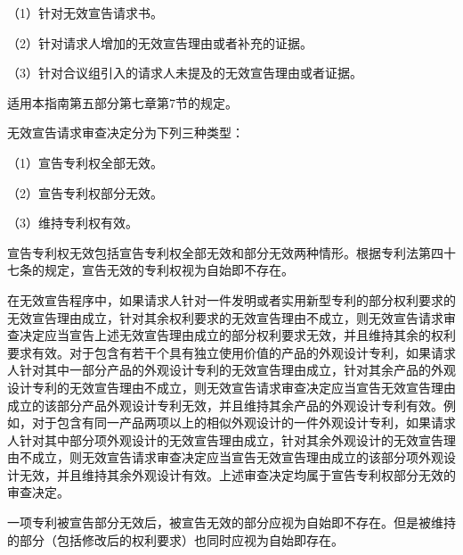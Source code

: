{\setlength{\parindent}{17.1bp}（1）针对无效宣告请求书。\par}

{\setlength{\parindent}{17.1bp}（2）针对请求人增加的无效宣告理由或者补充的证据。\par}

{\setlength{\parindent}{17.1bp}（3）针对合议组引入的请求人未提及的无效宣告理由或者证据。\par}



适用本指南第五部分第七章第7节的规定。

无效宣告请求审查决定分为下列三种类型：

{\setlength{\parindent}{17.1bp}（1）宣告专利权全部无效。\par}

{\setlength{\parindent}{17.1bp}（2）宣告专利权部分无效。\par}

{\setlength{\parindent}{17.1bp}（3）维持专利权有效。\par}

宣告专利权无效包括宣告专利权全部无效和部分无效两种情形。根据专利法第四十七条的规定，宣告无效的专利权视为自始即不存在。

在无效宣告程序中，如果请求人针对一件发明或者实用新型专利的部分权利要求的无效宣告理由成立，针对其余权利要求的无效宣告理由不成立，则无效宣告请求审查决定应当宣告上述无效宣告理由成立的部分权利要求无效，并且维持其余的权利要求有效。对于包含有若干个具有独立使用价值的产品的外观设计专利，如果请求人针对其中一部分产品的外观设计专利的无效宣告理由成立，针对其余产品的外观设计专利的无效宣告理由不成立，则无效宣告请求审查决定应当宣告无效宣告理由成立的该部分产品外观设计专利无效，并且维持其余产品的外观设计专利有效。例如，对于包含有同一产品两项以上的相似外观设计的一件外观设计专利，如果请求人针对其中部分项外观设计的无效宣告理由成立，针对其余外观设计的无效宣告理由不成立，则无效宣告请求审查决定应当宣告无效宣告理由成立的该部分项外观设计无效，并且维持其余外观设计有效。上述审查决定均属于宣告专利权部分无效的审查决定。

一项专利被宣告部分无效后，被宣告无效的部分应视为自始即不存在。但是被维持的部分（包括修改后的权利要求）也同时应视为自始即存在。

